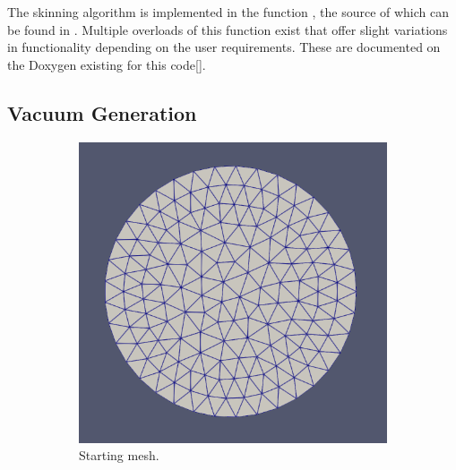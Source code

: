 \documentclass[12pt, letterpaper]{article}
\begin{document}
The skinning algorithm is implemented in the function , the source of which can be found in . Multiple overloads of this function exist that offer slight variations in functionality depending on the user requirements. These are documented on the Doxygen existing for this code[]. 


\subsection{Vacuum Generation}
\begin{figure}[ht]
	\begin{subfigure}{0.4\textwidth}
	    \includegraphics[width=\linewidth]{	processExample/circle.png}
	    \caption{Starting mesh.}
	\end{subfigure}
	\hspace*{\fill}	
	\begin{subfigure}{0.4\textwidth}

\end{subfigure}
\end{figure}
\end{document}
